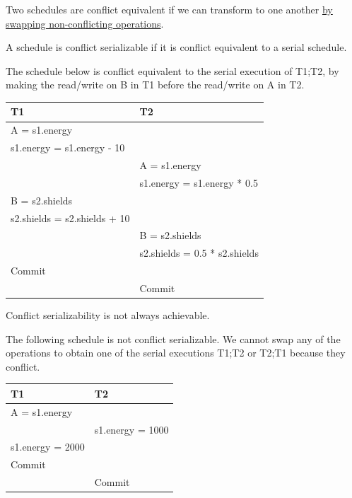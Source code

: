 \documentclass{beamer}
\begin{document}
\begin{slide}{
	\item Two schedules are conflict equivalent if we can transform to one another \underline{by swapping non-conflicting operations}.
	\item A schedule is conflict serializable if it is conflict equivalent to a serial schedule.
	\item The schedule below is conflict equivalent to the serial execution of T1;T2, by making the read/write on B in T1 before the read/write on A in T2.
	\begin{table}
		\tiny
		\begin{tabular}{l|l}
			T1 & T2\\
			\hline
			A = s1.energy & \\
			s1.energy = s1.energy - 10 & \\
			& A = s1.energy \\
			& s1.energy = s1.energy * 0.5 \\
			B = s2.shields & \\
			s2.shields = s2.shields + 10 & \\
			& B = s2.shields \\
			& s2.shields = 0.5 * s2.shields \\
			Commit & \\
			& Commit\\			
		\end{tabular}
	\end{table}	
	}\end{slide}
	
\begin{slide}{
	\item Conflict serializability is not always achievable.
	\item The following schedule is not conflict serializable. We cannot swap any of the operations to obtain one of the serial executions T1;T2 or T2;T1 because they conflict.
	\begin{table}
		\tiny
		\begin{tabular}{l|l}
			T1 & T2\\
			\hline
			A = s1.energy & \\
			& s1.energy = 1000 \\
			s1.energy = 2000 & \\
			Commit & \\
			& Commit \\		
		\end{tabular}
	\end{table}	
}\end{slide}
\end{document}
